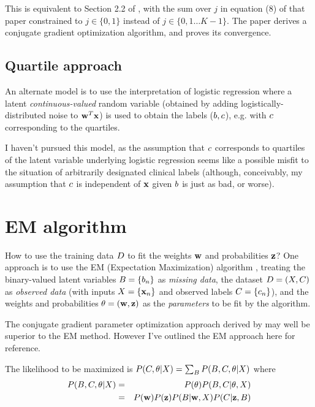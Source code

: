 \documentclass{article}
\begin{document}
This is equivalent to Section 2.2 of \cite{BootkrajangKaban2012},
with the sum over $j$ in equation (8) of that paper constrained to $j\in\{0,1\}$
instead of $j\in\{0,1\ldots K-1\}$.
The paper derives a conjugate gradient optimization algorithm,
and proves its convergence.

\subsection{Quartile approach}

An alternate model is to use the interpretation of logistic regression where a latent {\em continuous-valued} random variable
(obtained by adding logistically-distributed noise to ${\bf w}^T {\bf x}$)
is used to obtain the labels ($b,c$),
e.g. with $c$ corresponding to the quartiles.

I haven't pursued this model, as the assumption that $c$ corresponds to quartiles of the latent variable underlying
logistic regression seems like a possible misfit to the situation of arbitrarily designated clinical labels
(although, conceivably, my assumption that $c$ is independent of ${\bf x}$ given $b$ is just as bad, or worse).


\section{EM algorithm}

How to use the training data $D$ to fit the weights ${\bf w}$ and probabilities ${\bf z}$?
One approach is to use the EM (Expectation Maximization) algorithm \cite{DempsterLairdRubin77},
treating the binary-valued latent variables $B = \{ b_n \}$ as {\em missing data},
the dataset $D = (X,C)$ as {\em observed data}
(with inputs $X = \{ {\bf x}_n \}$ and observed labels $C = \{ c_n \}$),
and the weights and probabilities $\theta = ({\bf w},{\bf z})$ as the {\em parameters} to be fit by the algorithm.

The conjugate gradient parameter optimization approach
derived by \cite{BootkrajangKaban2012} may well be superior to the EM method.
However I've outlined the EM approach here for reference.

The likelihood to be maximized is
$P(C,\theta|X) = \sum_{B} P(B,C,\theta|X)$
where
\begin{eqnarray*}
  P(B,C,\theta|X)
  & = & P(\theta) P(B,C|\theta,X) \\
  & = & P({\bf w}) P({\bf z}) P(B|{\bf w},X) P(C|{\bf z},B)
\end{eqnarray*}
\end{document}
